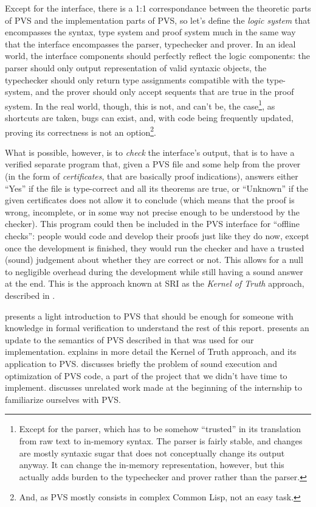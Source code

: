 \documentclass[utf8,a4paper]{article}
\begin{document}
Except for the interface, there is a 1:1 correspondance between the
theoretic parts of PVS and the implementation parts of PVS, so let's
define the \textit{logic system} that encompasses the syntax, type
system and proof system much in the same way that the interface
encompasses the parser, typechecker and prover. In an ideal world, the
interface components should perfectly reflect the logic components:
the parser should only output representation of valid syntaxic
objects, the typechecker should only return type assignments
compatible with the type-system, and the prover should only accept
sequents that are true in the proof system. In the real world, though,
this is not, and can't be, the case\footnote{Except for the parser,
  which has to be somehow ``trusted'' in its translation from raw text
  to in-memory syntax. The parser is fairly stable, and changes are
  mostly syntaxic sugar that does not conceptually change its output
  anyway. It can change the in-memory representation, however, but
  this actually adds burden to the typechecker and prover rather than
  the parser.}, as shortcuts are taken, bugs can exist, and, with code
being frequently updated, proving its correctness is not an
option\footnote{And, as PVS mostly consists in complex Common Lisp,
  not an easy task.}.

What is possible, however, is to \textit{check} the interface's
output, that is to have a verified separate program that, given a PVS
file and some help from the prover (in the form of
\textit{certificates}, that are basically proof indications), answers
either ``Yes'' if the file is type-correct and all its theorems are
true, or ``Unknown'' if the given certificates does not allow it to
conclude (which means that the proof is wrong, incomplete, or in some
way not precise enough to be understood by the checker). This program
could then be included in the PVS interface for ``offline checks'':
people would code and develop their proofs just like they do now,
except once the development is finished, they would run the checker
and have a trusted (sound) judgement about whether they are correct or
not. This allows for a null to negligible overhead during the
development while still having a sound answer at the end. This is the
approach known at SRI as the \textit{Kernel of Truth} approach,
described in \cite{RIP10}.

 presents a light introduction to PVS that should be
enough for someone with knowledge in formal verification to understand
the rest of this report.  presents an update to the
semantics of PVS described in \cite{PVS-Semantics:TR} that was used
for our implementation.  explains in more detail the
Kernel of Truth approach, and its application to PVS. 
discusses briefly the problem of sound execution and optimization of
PVS code, a part of the project that we didn't have time to
implement.  discusses unrelated work made at the
beginning of the internship to familiarize ourselves with PVS.
\end{document}
